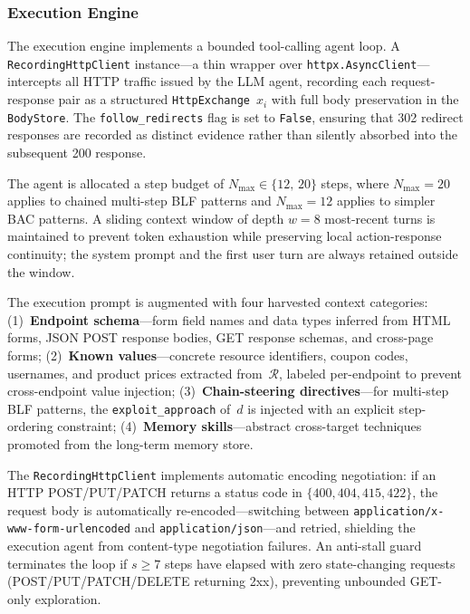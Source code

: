 \subsubsection{Execution Engine}

The execution engine implements a bounded tool-calling agent loop.
A \texttt{RecordingHttpClient} instance---a thin wrapper over
\texttt{httpx.AsyncClient}---intercepts all HTTP traffic issued by the
LLM agent, recording each request-response pair as a structured
\texttt{HttpExchange}~$x_i$ with full body preservation in the
\texttt{BodyStore}.
The \texttt{follow\_redirects} flag is set to \texttt{False}, ensuring
that 302 redirect responses are recorded as distinct evidence rather
than silently absorbed into the subsequent 200 response.

The agent is allocated a step budget of
$N_{\max} \in \{12,\, 20\}$ steps, where $N_{\max} = 20$ applies to
chained multi-step BLF patterns and $N_{\max} = 12$ applies to
simpler BAC patterns.
A sliding context window of depth $w = 8$ most-recent turns is
maintained to prevent token exhaustion while preserving local
action-response continuity; the system prompt and the first user turn
are always retained outside the window.

The execution prompt is augmented with four harvested context
categories:
(1)~\textbf{Endpoint schema}---form field names and data types inferred
from HTML forms, JSON POST response bodies, GET response schemas, and
cross-page forms;
(2)~\textbf{Known values}---concrete resource identifiers, coupon codes,
usernames, and product prices extracted from~$\mathcal{R}$, labeled
per-endpoint to prevent cross-endpoint value injection;
(3)~\textbf{Chain-steering directives}---for multi-step BLF patterns,
the \texttt{exploit\_approach} of~$d$ is injected with an explicit
step-ordering constraint;
(4)~\textbf{Memory skills}---abstract cross-target techniques promoted
from the long-term memory store.

The \texttt{RecordingHttpClient} implements automatic encoding
negotiation: if an HTTP POST/PUT/PATCH returns a status code in
$\{400, 404, 415, 422\}$, the request body is automatically
re-encoded---switching between \texttt{application/x-www-form-urlencoded}
and \texttt{application/json}---and retried, shielding the execution
agent from content-type negotiation failures.
An anti-stall guard terminates the loop if $s \geq 7$ steps have elapsed
with zero state-changing requests (POST/PUT/PATCH/DELETE returning 2xx),
preventing unbounded GET-only exploration.

